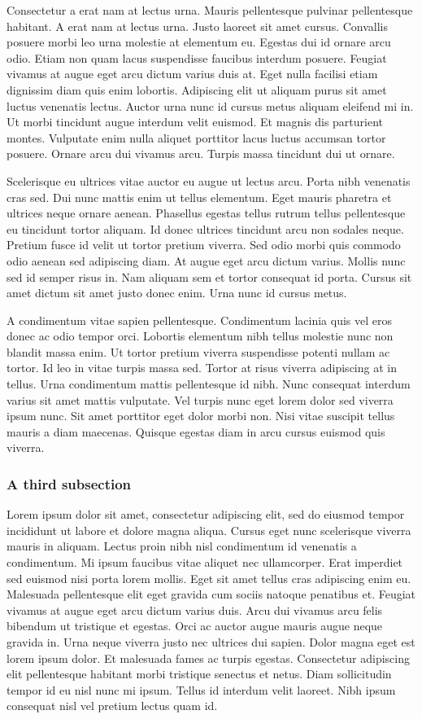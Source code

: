 \documentclass[red, openany, logo-1e]{shadowrun}
\begin{document}
Consectetur a erat nam at lectus urna. Mauris pellentesque pulvinar pellentesque habitant. A erat nam at lectus urna. Justo laoreet sit amet cursus. Convallis posuere morbi leo urna molestie at elementum eu. Egestas dui id ornare arcu odio. Etiam non quam lacus suspendisse faucibus interdum posuere. Feugiat vivamus at augue eget arcu dictum varius duis at. Eget nulla facilisi etiam dignissim diam quis enim lobortis. Adipiscing elit ut aliquam purus sit amet luctus venenatis lectus. Auctor urna nunc id cursus metus aliquam eleifend mi in. Ut morbi tincidunt augue interdum velit euismod. Et magnis dis parturient montes. Vulputate enim nulla aliquet porttitor lacus luctus accumsan tortor posuere. Ornare arcu dui vivamus arcu. Turpis massa tincidunt dui ut ornare.

Scelerisque eu ultrices vitae auctor eu augue ut lectus arcu. Porta nibh venenatis cras sed. Dui nunc mattis enim ut tellus elementum. Eget mauris pharetra et ultrices neque ornare aenean. Phasellus egestas tellus rutrum tellus pellentesque eu tincidunt tortor aliquam. Id donec ultrices tincidunt arcu non sodales neque. Pretium fusce id velit ut tortor pretium viverra. Sed odio morbi quis commodo odio aenean sed adipiscing diam. At augue eget arcu dictum varius. Mollis nunc sed id semper risus in. Nam aliquam sem et tortor consequat id porta. Cursus sit amet dictum sit amet justo donec enim. Urna nunc id cursus metus.

A condimentum vitae sapien pellentesque. Condimentum lacinia quis vel eros donec ac odio tempor orci. Lobortis elementum nibh tellus molestie nunc non blandit massa enim. Ut tortor pretium viverra suspendisse potenti nullam ac tortor. Id leo in vitae turpis massa sed. Tortor at risus viverra adipiscing at in tellus. Urna condimentum mattis pellentesque id nibh. Nunc consequat interdum varius sit amet mattis vulputate. Vel turpis nunc eget lorem dolor sed viverra ipsum nunc. Sit amet porttitor eget dolor morbi non. Nisi vitae suscipit tellus mauris a diam maecenas. Quisque egestas diam in arcu cursus euismod quis viverra.

\subsubsection{A third subsection}
Lorem ipsum dolor sit amet, consectetur adipiscing elit, sed do eiusmod tempor incididunt ut labore et dolore magna aliqua. Cursus eget nunc scelerisque viverra mauris in aliquam. Lectus proin nibh nisl condimentum id venenatis a condimentum. Mi ipsum faucibus vitae aliquet nec ullamcorper. Erat imperdiet sed euismod nisi porta lorem mollis. Eget sit amet tellus cras adipiscing enim eu. Malesuada pellentesque elit eget gravida cum sociis natoque penatibus et. Feugiat vivamus at augue eget arcu dictum varius duis. Arcu dui vivamus arcu felis bibendum ut tristique et egestas. Orci ac auctor augue mauris augue neque gravida in. Urna neque viverra justo nec ultrices dui sapien. Dolor magna eget est lorem ipsum dolor. Et malesuada fames ac turpis egestas. Consectetur adipiscing elit pellentesque habitant morbi tristique senectus et netus. Diam sollicitudin tempor id eu nisl nunc mi ipsum. Tellus id interdum velit laoreet. Nibh ipsum consequat nisl vel pretium lectus quam id.
\end{document}
